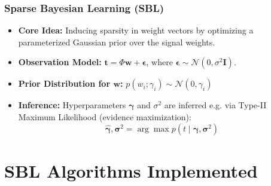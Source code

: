\documentclass{beamer}
\begin{document}
\begin{frame}
    \frametitle{Sparse Bayesian Learning (SBL)}
    \begin{itemize}
        \item \textbf{Core Idea:} Inducing sparsity in weight vectors by optimizing a parameterized Gaussian prior over the signal weights.
        \item \textbf{Observation Model:} $\mathbf{t} = \Phi \mathbf{w} + \boldsymbol{\epsilon}$, where $\boldsymbol{\epsilon} \sim \mathcal{N}(0, \sigma^2 \mathbf{I})$.
        \item \textbf{Prior Distribution for $\mathbf{w}$:} $p(w_i;\gamma_i) \sim \mathcal{N}(0,\gamma_i)$
        \item \textbf{Inference:} Hyperparameters $\boldsymbol{\gamma}$ and $\sigma^2$ are inferred e.g. via Type-II Maximum Likelihood (evidence maximization):
        \begin{equation}
        	\hat{\mathbf{\gamma}},\mathbf{\sigma}^2= \arg\max p(t\mid\mathbf{\gamma},\mathbf{\sigma}^2)
        \end{equation}
    \end{itemize}
\end{frame}

\section{SBL Algorithms Implemented}
\end{document}
